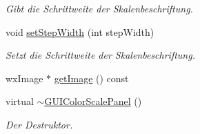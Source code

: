 \begin{DoxyCompactItemize}
\begin{DoxyCompactList}\small\item\em Gibt die Schrittweite der Skalenbeschriftung. \end{DoxyCompactList}\item 
void \hyperlink{classGUIColorScalePanel_aba534a319236878bc3504050d8227fe4}{set\-Step\-Width} (int step\-Width)
\begin{DoxyCompactList}\small\item\em Setzt die Schrittweite der Skalenbeschriftung. \end{DoxyCompactList}\item 
wx\-Image $\ast$ \hyperlink{classGUIColorScalePanel_ac793a56373a8f7f5cb8d3e413c26e8e7}{get\-Image} () const 
\item 
virtual \hyperlink{classGUIColorScalePanel_a7e6f0e0703269ce666989af49fef3369}{$\sim$\-G\-U\-I\-Color\-Scale\-Panel} ()
\begin{DoxyCompactList}\small\item\em Der Destruktor. \end{DoxyCompactList}\end{DoxyCompactItemize}
